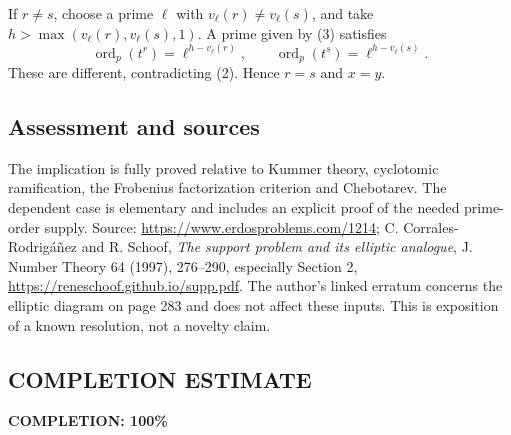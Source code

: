 If $r\ne s$, choose a prime $\ell$ with $v_\ell(r)\ne v_\ell(s)$, and take $h>\max(v_\ell(r),v_\ell(s),1)$. A prime given by (3) satisfies
\[
 \operatorname{ord}_p(t^r)=\ell^{h-v_\ell(r)},\qquad
 \operatorname{ord}_p(t^s)=\ell^{h-v_\ell(s)}.
\]
These are different, contradicting (2). Hence $r=s$ and $x=y$.

\subsection*{Assessment and sources}
The implication is fully proved relative to Kummer theory, cyclotomic ramification, the Frobenius factorization criterion and Chebotarev. The dependent case is elementary and includes an explicit proof of the needed prime-order supply. Source: \url{https://www.erdosproblems.com/1214}; C. Corrales-Rodrig\'a\~nez and R. Schoof, \emph{The support problem and its elliptic analogue}, J. Number Theory 64 (1997), 276--290, especially Section 2, \url{https://reneschoof.github.io/supp.pdf}. The author's linked erratum concerns the elliptic diagram on page 283 and does not affect these inputs. This is exposition of a known resolution, not a novelty claim.
\subsection*{COMPLETION ESTIMATE}
\textbf{COMPLETION: 100\%}

